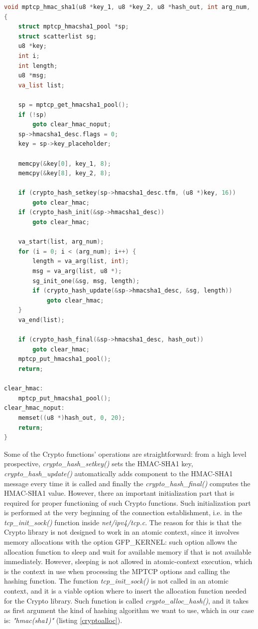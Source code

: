 \begin{lstlisting}[language=c, caption=\textit{\textit{mptcp\_hmac\_sha1() using Linux kernel Crypto API}}, label=crypto]
void mptcp_hmac_sha1(u8 *key_1, u8 *key_2, u8 *hash_out, int arg_num, ...)
{
	struct mptcp_hmacsha1_pool *sp;
	struct scatterlist sg;
	u8 *key;
	int i;
	int length;
	u8 *msg;
	va_list list;

	sp = mptcp_get_hmacsha1_pool();
	if (!sp)
		goto clear_hmac_noput;
	sp->hmacsha1_desc.flags = 0;
	key = sp->key_placeholder;

	memcpy(&key[0], key_1, 8);
	memcpy(&key[8], key_2, 8);

	if (crypto_hash_setkey(sp->hmacsha1_desc.tfm, (u8 *)key, 16))
		goto clear_hmac;
	if (crypto_hash_init(&sp->hmacsha1_desc))
		goto clear_hmac;

	va_start(list, arg_num);
	for (i = 0; i < (arg_num); i++) {
		length = va_arg(list, int);
		msg = va_arg(list, u8 *);
		sg_init_one(&sg, msg, length);
		if (crypto_hash_update(&sp->hmacsha1_desc, &sg, length))
			goto clear_hmac;
	}
	va_end(list);

	if (crypto_hash_final(&sp->hmacsha1_desc, hash_out))
		goto clear_hmac;
	mptcp_put_hmacsha1_pool();
	return;

clear_hmac:
	mptcp_put_hmacsha1_pool();
clear_hmac_noput:
	memset((u8 *)hash_out, 0, 20);
	return;
}
\end{lstlisting}

Some of the Crypto functions' operations are straightforward: from a high level prospective, \textit{crypto\_hash\_setkey()} sets the HMAC-SHA1 key, \textit{crypto\_hash\_update()} automatically adds component to the HMAC-SHA1 message every time it is called and finally the \textit{crypto\_hash\_final()} computes the HMAC-SHA1 value.
However, there an important initialization part that is required for proper functioning of such Crypto functions. Such initialization part is performed at the very beginning of the connection establishment, i.e. in the \textit{tcp\_init\_sock()} function inside \textit{net/ipv4/tcp.c}. The reason for this is that the Crypto library is not designed to work in an atomic context, since it involves memory allocations with the option GFP\_KERNEL: such option allows the allocation function to sleep and wait for available memory if that is not available immediately. However, sleeping is not allowed in atomic-context execution, which is the context in use when processing the MPTCP options and calling the hashing function. The function \textit{tcp\_init\_sock()} is not called in an atomic context, and it is a viable option where to insert the allocation function needed for the Crypto library. Such function is called \textit{crypto\_alloc\_hash()}, and it takes as first argument the kind of hashing algorithm we want to use, which in our case is: \textit{"hmac(sha1)"} (listing \ref{cryptoalloc}).

